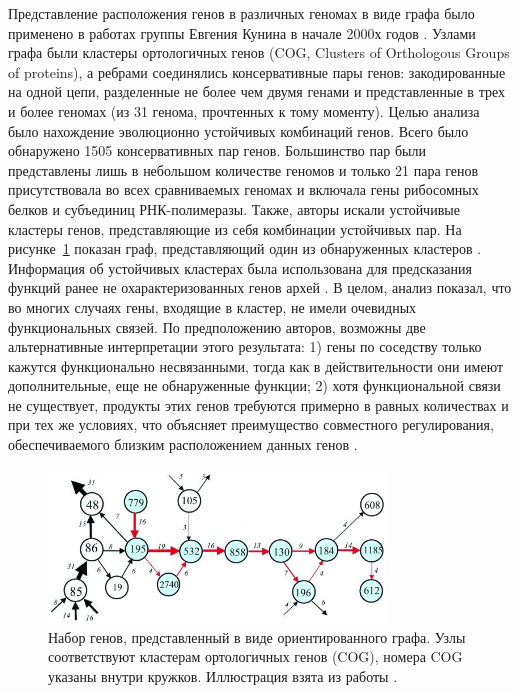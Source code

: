 Представление расположения генов в различных геномах в виде графа было применено в работах группы Евгения Кунина в начале 2000х годов \cite{rogozin2002connected, makarova2002dna}. Узлами графа были кластеры ортологичных генов (COG, Clusters of Orthologous Groups of proteins), а ребрами соединялись консервативные пары генов: закодированные на одной цепи, разделенные не более чем двумя генами и представленные в трех и более геномах (из 31 генома, прочтенных к тому моменту).  Целью анализа было нахождение эволюционно устойчивых комбинаций генов. Всего было обнаружено 1505 консервативных пар генов. Большинство пар были представлены лишь в небольшом количестве геномов и только 21 пара генов присутствовала во всех сравниваемых геномах и включала гены рибосомных белков и субъединиц РНК-полимеразы. Также, авторы искали устойчивые кластеры генов, представляющие из себя комбинации устойчивых пар. На рисунке~\ref{img:rogozin_graph} показан граф, представляющий один из обнаруженных кластеров \cite{rogozin2002connected}. Информация об устойчивых кластерах была использована для предсказания функций ранее не охарактеризованных генов архей \cite{makarova2002dna}. В целом, анализ показал, что во многих случаях гены, входящие в кластер, не имели очевидных функциональных связей. По предположению авторов, возможны две альтернативные интерпретации этого результата: 1) гены по соседству только кажутся функционально несвязанными, тогда как в действительности они имеют дополнительные, еще не обнаруженные функции; 2) хотя функциональной связи не существует, продукты этих генов требуются примерно в равных количествах и при тех же условиях, что объясняет преимущество совместного регулирования, обеспечиваемого близким расположением данных генов \cite{rogozin2002connected}. 

\begin{figure}[!ht] 
  \center
  \includegraphics [width=0.8\textwidth] {Dissertation/images/lit/rogozin_graph.jpg}
  \caption{Набор генов, представленный в виде ориентированного графа. Узлы соответствуют кластерам ортологичных генов (COG), номера COG указаны внутри кружков. Иллюстрация взята из работы \cite{rogozin2002connected}. } 
  \label{img:rogozin_graph}  
\end{figure}


